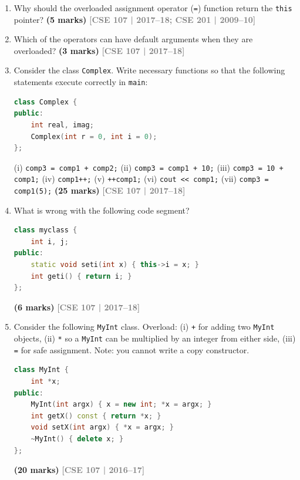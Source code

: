 \documentclass[12pt,a3paper]{article}
\newcommand{\yr}[1]{\hfill\textcolor{gray}{\small\textbf{[#1]}}}
\newcommand{\mk}[1]{\textcolor{orange!70!black}{\small\textbf{(#1 marks)}}}
\begin{document}
\begin{enumerate}




\item Why should the overloaded assignment operator (\texttt{=}) function return the \texttt{this} pointer? \mk{5}
\yr{CSE 107 | 2017--18; CSE 201 | 2009--10}




\item Which of the operators can have default arguments when they are overloaded? \mk{3}
\yr{CSE 107 | 2017--18}





\item Consider the class \texttt{Complex}. Write necessary functions so that the following statements execute correctly in \texttt{main}:
\begin{lstlisting}[language=C++]
class Complex {
public:
    int real, imag;
    Complex(int r = 0, int i = 0);
};
\end{lstlisting}
(i) \texttt{comp3 = comp1 + comp2;} \quad (ii) \texttt{comp3 = comp1 + 10;} \quad (iii) \texttt{comp3 = 10 + comp1;} \quad (iv) \texttt{comp1++;} \quad (v) \texttt{++comp1;} \quad (vi) \texttt{cout << comp1;} \quad (vii) \texttt{comp3 = comp1(5);}
\mk{25}
\yr{CSE 107 | 2017--18}





\item What is wrong with the following code segment?
\begin{lstlisting}[language=C++]
class myclass {
    int i, j;
public:
    static void seti(int x) { this->i = x; }
    int geti() { return i; }
};
\end{lstlisting}
\mk{6}
\yr{CSE 107 | 2017--18}





\item Consider the following \texttt{MyInt} class. Overload: (i) \texttt{+} for adding two \texttt{MyInt} objects, (ii) \texttt{*} so a \texttt{MyInt} can be multiplied by an integer from either side, (iii) \texttt{=} for safe assignment. Note: you cannot write a copy constructor.
\begin{lstlisting}[language=C++]
class MyInt {
    int *x;
public:
    MyInt(int argx) { x = new int; *x = argx; }
    int getX() const { return *x; }
    void setX(int argx) { *x = argx; }
    ~MyInt() { delete x; }
};
\end{lstlisting}
\mk{20}
\yr{CSE 107 | 2016--17}



\end{enumerate}
\end{document}
